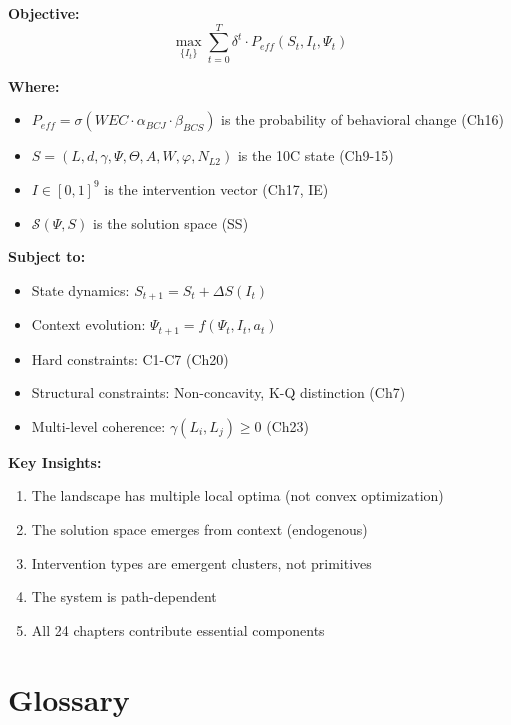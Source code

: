 \begin{tcolorbox}[colback=green!5!white, colframe=green!75!black,
    title=\textbf{The Complete EBF Optimization Problem}]

\textbf{Objective:}
\[
\max_{\{I_t\}} \sum_{t=0}^{T} \delta^t \cdot P_{eff}(S_t, I_t, \Psi_t)
\]

\textbf{Where:}
\begin{itemize}[nosep]
\item $P_{eff} = \sigma(WEC \cdot \alpha_{BCJ} \cdot \beta_{BCS})$ is the probability of behavioral change (Ch16)
\item $S = (L, d, \gamma, \Psi, \Theta, A, W, \varphi, N_{L2})$ is the 10C state (Ch9-15)
\item $I \in [0,1]^9$ is the intervention vector (Ch17, IE)
\item $\mathcal{S}(\Psi, S)$ is the solution space (SS)
\end{itemize}

\textbf{Subject to:}
\begin{itemize}[nosep]
\item State dynamics: $S_{t+1} = S_t + \Delta S(I_t)$
\item Context evolution: $\Psi_{t+1} = f(\Psi_t, I_t, a_t)$
\item Hard constraints: C1-C7 (Ch20)
\item Structural constraints: Non-concavity, K-Q distinction (Ch7)
\item Multi-level coherence: $\gamma(L_i, L_j) \geq 0$ (Ch23)
\end{itemize}

\textbf{Key Insights:}
\begin{enumerate}
\item The landscape has multiple local optima (not convex optimization)
\item The solution space emerges from context (endogenous)
\item Intervention types are emergent clusters, not primitives
\item The system is path-dependent
\item All 24 chapters contribute essential components
\end{enumerate}

\end{tcolorbox}

\section{Glossary}
\label{sec:mp-glossary}


